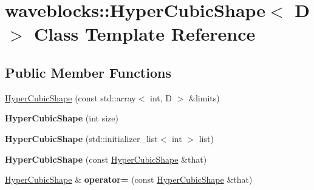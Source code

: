 \hypertarget{classwaveblocks_1_1_hyper_cubic_shape}{}\section{waveblocks\+:\+:Hyper\+Cubic\+Shape$<$ D $>$ Class Template Reference}
\label{classwaveblocks_1_1_hyper_cubic_shape}
\subsection*{Public Member Functions}
\begin{DoxyCompactItemize}
\item 
\hyperlink{classwaveblocks_1_1_hyper_cubic_shape_a9ed1b8425e675e49c646fa7c0dfbd3b6}{Hyper\+Cubic\+Shape} (const std\+::array$<$ int, D $>$ \&limits)
\item 
\hypertarget{classwaveblocks_1_1_hyper_cubic_shape_a2c8bdf97b9adf7913f12a93567633245}{}{\bfseries Hyper\+Cubic\+Shape} (int size)\label{classwaveblocks_1_1_hyper_cubic_shape_a2c8bdf97b9adf7913f12a93567633245}

\item 
\hypertarget{classwaveblocks_1_1_hyper_cubic_shape_a834332a9f37fbe24f900e02369f5bba3}{}{\bfseries Hyper\+Cubic\+Shape} (std\+::initializer\+\_\+list$<$ int $>$ list)\label{classwaveblocks_1_1_hyper_cubic_shape_a834332a9f37fbe24f900e02369f5bba3}

\item 
\hypertarget{classwaveblocks_1_1_hyper_cubic_shape_aaf457cae4d450c3bb59e5e9f7c73388c}{}{\bfseries Hyper\+Cubic\+Shape} (const \hyperlink{classwaveblocks_1_1_hyper_cubic_shape}{Hyper\+Cubic\+Shape} \&that)\label{classwaveblocks_1_1_hyper_cubic_shape_aaf457cae4d450c3bb59e5e9f7c73388c}

\item 
\hypertarget{classwaveblocks_1_1_hyper_cubic_shape_aba44b2a553b84c130549cf84dc9afc47}{}\hyperlink{classwaveblocks_1_1_hyper_cubic_shape}{Hyper\+Cubic\+Shape} \& {\bfseries operator=} (const \hyperlink{classwaveblocks_1_1_hyper_cubic_shape}{Hyper\+Cubic\+Shape} \&that)\label{classwaveblocks_1_1_hyper_cubic_shape_aba44b2a553b84c130549cf84dc9afc47}


\end{DoxyCompactItemize}
